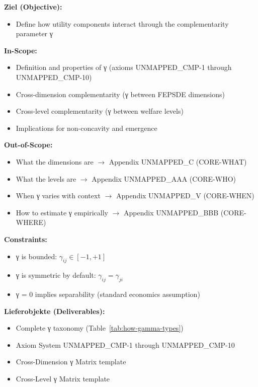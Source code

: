 
\begin{tcolorbox}[
    colback=orange!5!white,
    colframe=orange!75!black,
    title={\textbf{Appendix Scope: Ziel / In-Scope / Out-of-Scope / Constraints}},
    fonttitle=\bfseries
]

\textbf{Ziel (Objective):}
\begin{itemize}[nosep]
    \item Define how utility components interact through the complementarity parameter γ
\end{itemize}

\textbf{In-Scope:}
\begin{itemize}[nosep]
    \item Definition and properties of γ (axioms UNMAPPED_CMP-1 through UNMAPPED_CMP-10)
    \item Cross-dimension complementarity (γ between FEPSDE dimensions)
    \item Cross-level complementarity (γ between welfare levels)
    \item Implications for non-concavity and emergence
\end{itemize}

\textbf{Out-of-Scope:}
\begin{itemize}[nosep]
    \item What the dimensions are $\rightarrow$ Appendix UNMAPPED_C (CORE-WHAT)
    \item What the levels are $\rightarrow$ Appendix UNMAPPED_AAA (CORE-WHO)
    \item When γ varies with context $\rightarrow$ Appendix UNMAPPED_V (CORE-WHEN)
    \item How to estimate γ empirically $\rightarrow$ Appendix UNMAPPED_BBB (CORE-WHERE)
\end{itemize}

\textbf{Constraints:}
\begin{itemize}[nosep]
    \item γ is bounded: $\gamma_{ij} \in [-1, +1]$
    \item γ is symmetric by default: $\gamma_{ij} = \gamma_{ji}$
    \item γ = 0 implies separability (standard economics assumption)
\end{itemize}

\textbf{Lieferobjekte (Deliverables):}
\begin{itemize}[nosep]
    \item Complete γ taxonomy (Table~\ref{tab:how-gamma-types})
    \item Axiom System UNMAPPED_CMP-1 through UNMAPPED_CMP-10
    \item Cross-Dimension γ Matrix template
    \item Cross-Level γ Matrix template
\end{itemize}

\end{tcolorbox}

